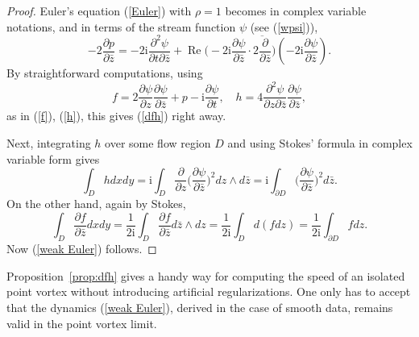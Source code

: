 \documentclass[reqno,12pt]{article}
\theoremstyle{plain}
\theoremstyle{definition}
\numberwithin{equation}{section}
\numberwithin{figure}{section}
\DeclareMathOperator{\re}{Re}
\def\I{\mathrm{i}}
\begin{document}
\begin{proof}
Euler's equation (\ref{Euler}) with $\rho=1$ becomes in complex variable notations, 
and in terms of the stream function $\psi$ (see (\ref{wpsi})), 
$$
-2\frac{\partial p}{\partial \bar{z}}=-2\I \frac{\partial^2\psi}{\partial t\partial \bar{z}}
+\re\Big(-2\I\frac{\partial\psi}{\partial \bar{z}}\cdot\overline{2\frac{\partial}{\partial \bar{z}}}\Big)(-2\I\frac{\partial \psi}{\partial \bar{z}}).
$$
By straightforward computations, using 
$$
f=2\frac{\partial \psi}{\partial z}\frac{\partial \psi}{\partial \bar{z}}+p-\I \frac{\partial \psi}{\partial t},
\quad h=4\frac{\partial^2 \psi}{\partial z\partial \bar{z}}\frac{\partial \psi}{\partial \bar{z}},
$$
as in (\ref{f}), (\ref{h}), this gives (\ref{dfh}) right away. 

Next, integrating $h$ over some flow region $D$ 
and using Stokes' formula in complex variable form gives
$$
\int_D h dx dy=\I\int_D \frac{\partial }{\partial z}\Big(\frac{\partial \psi}{\partial \bar{z}}\Big)^2 dz\wedge d\bar{z}
=\I\int_{\partial D}\Big(\frac{\partial \psi}{\partial \bar{z}}\Big)^2d\bar{z}.
$$
On the other hand, again by Stokes,
$$ 
\int_D \frac{\partial f}{\partial \bar{z}} dx dy=\frac{1}{2\I}\int_D\frac{\partial f}{\partial \bar{z}}d\bar{z}\wedge dz
=\frac{1}{2\I}\int_Dd(fdz)=\frac{1}{2\I}\int_{\partial D}fdz.
$$
Now (\ref{weak Euler}) follows.
\end{proof}

Proposition~\ref{prop:dfh} gives a handy way for computing the speed of an isolated point vortex
without introducing artificial regularizations. One only has to accept that the dynamics (\ref{weak Euler}),
derived in the case of smooth data, remains valid in the point vortex limit.
\end{document}
